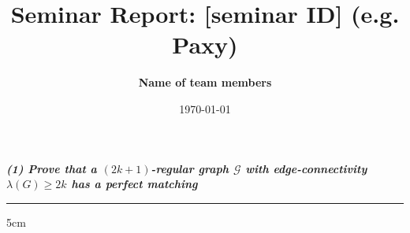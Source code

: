 \documentclass[a4paper, 10pt]{article}
\title{Seminar Report: [seminar ID] (e.g. Paxy)}
\author{\textbf{Name of team members}}
\date{\normalsize\today{}}
\begin{document}
\maketitle


\textbf{\textit{(1) Prove that a $(2k+1)$-regular graph $\mathcal{G}$ with edge-connectivity $\lambda(G) \geq 2k$ has a perfect matching}}

\begin{center}
    \hrule{5cm}
\end{center}
\end{document}

